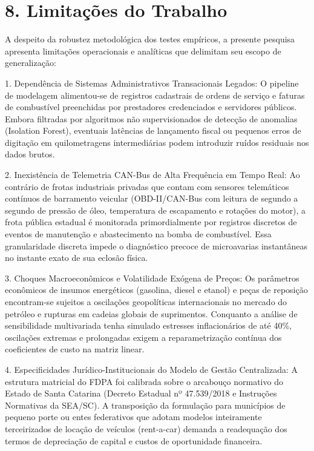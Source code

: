 \documentclass[10pt,a4paper,journal]{article}
\begin{document}
\section{8. Limitações do Trabalho}
A despeito da robustez metodológica dos testes empíricos, a presente pesquisa apresenta limitações operacionais e analíticas que delimitam seu escopo de generalização:

1. Dependência de Sistemas Administrativos Transacionais Legados: O pipeline de modelagem alimentou-se de registros cadastrais de ordens de serviço e faturas de combustível preenchidas por prestadores credenciados e servidores públicos. Embora filtradas por algoritmos não supervisionados de detecção de anomalias (Isolation Forest), eventuais latências de lançamento fiscal ou pequenos erros de digitação em quilometragens intermediárias podem introduzir ruídos residuais nos dados brutos.

2. Inexistência de Telemetria CAN-Bus de Alta Frequência em Tempo Real: Ao contrário de frotas industriais privadas que contam com sensores telemáticos contínuos de barramento veicular (OBD-II/CAN-Bus com leitura de segundo a segundo de pressão de óleo, temperatura de escapamento e rotações do motor), a frota pública estadual é monitorada primordialmente por registros discretos de eventos de manutenção e abastecimento na bomba de combustível. Essa granularidade discreta impede o diagnóstico precoce de microavarias instantâneas no instante exato de sua eclosão física.

3. Choques Macroeconômicos e Volatilidade Exógena de Preços: Os parâmetros econômicos de insumos energéticos (gasolina, diesel e etanol) e peças de reposição encontram-se sujeitos a oscilações geopolíticas internacionais no mercado do petróleo e rupturas em cadeias globais de suprimentos. Conquanto a análise de sensibilidade multivariada tenha simulado estresses inflacionários de até 40\%, oscilações extremas e prolongadas exigem a reparametrização contínua dos coeficientes de custo na matriz linear.

4. Especificidades Jurídico-Institucionais do Modelo de Gestão Centralizada: A estrutura matricial do FDPA foi calibrada sobre o arcabouço normativo do Estado de Santa Catarina (Decreto Estadual nº 47.539/2018 e Instruções Normativas da SEA/SC). A transposição da formulação para municípios de pequeno porte ou entes federativos que adotam modelos inteiramente terceirizados de locação de veículos (rent-a-car) demanda a readequação dos termos de depreciação de capital e custos de oportunidade financeira.
\end{document}
